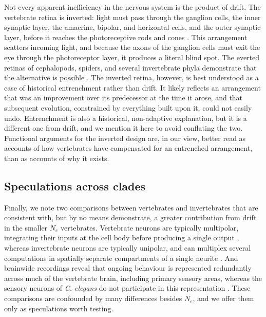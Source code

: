 \documentclass[twocolumn]{article}
\begin{document}
Not every apparent inefficiency in the nervous system is the product of drift. The vertebrate retina is inverted: light must pass through the ganglion cells, the inner synaptic layer, the amacrine, bipolar, and horizontal cells, and the outer synaptic layer, before it reaches the photoreceptive rods and cones \cite{sterling_laughlin_principles, land_nilsson_2012}. This arrangement scatters incoming light, and because the axons of the ganglion cells must exit the eye through the photoreceptor layer, it produces a literal blind spot. The everted retinas of cephalopods, spiders, and several invertebrate phyla demonstrate that the alternative is possible \cite{land_nilsson_2012, norgaard_2008, richter_2010, garm_2010}. The inverted retina, however, is best understood as a case of historical entrenchment rather than drift. It likely reflects an arrangement that was an improvement over its predecessor at the time it arose, and that subsequent evolution, constrained by everything built upon it, could not easily undo. Entrenchment is also a historical, non-adaptive explanation, but it is a different one from drift, and we mention it here to avoid conflating the two. Functional arguments for the inverted design \cite{kroger_2009} are, in our view, better read as accounts of how vertebrates have compensated for an entrenched arrangement, than as accounts of why it exists.

\subsection{Speculations across clades}

Finally, we note two comparisons between vertebrates and invertebrates that are consistent with, but by no means demonstrate, a greater contribution from drift in the smaller $N_e$ vertebrates. Vertebrate neurons are typically multipolar, integrating their inputs at the cell body before producing a single output \cite{hu_bean_2018, kandel2013principles}, whereas invertebrate neurons are typically unipolar, and can multiplex several computations in spatially separate compartments of a single neurite \cite{watson_burrows_1985, Hendricks_Ha_Maffey_Zhang_2012}. And brainwide recordings reveal that ongoing behaviour is represented redundantly across much of the vertebrate brain, including primary sensory areas, whereas the sensory neurons of \textit{C. elegans} do not participate in this representation \cite{stringer_harris_2019, kato_2015, kaplan_zimmer_2020, aimon_2019, schaffer_2021}. These comparisons are confounded by many differences besides $N_e$, and we offer them only as speculations worth testing.
\end{document}
